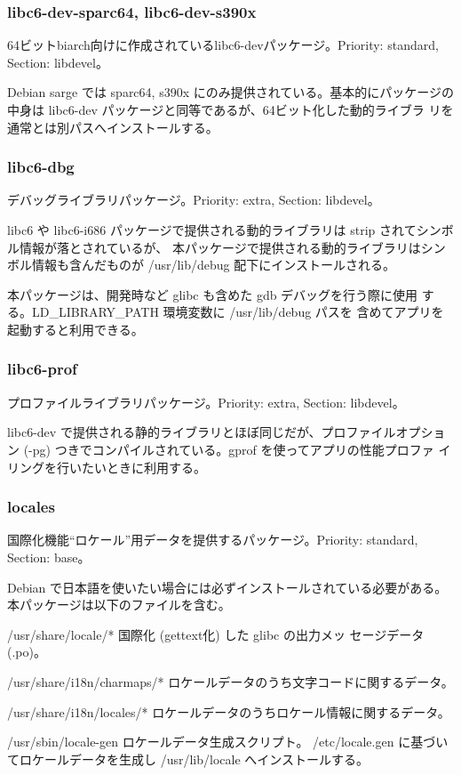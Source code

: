 \documentclass[mingoth]{jsarticle}
\newenvironment{gdescription}%
{%
   \begin{list}{}%
   {%
      \setlength{\itemindent}{0mm}
      \setlength{\leftmargin}{45mm}%
      \setlength{\rightmargin}{0zw}%
      \setlength{\labelsep}{4mm}%
      \setlength{\labelwidth}{4cm}%
      \setlength{\itemsep}{0em}%
      \setlength{\parsep}{0cm}%
      \setlength{\listparindent}{0cm}%
      \let\makelabel\gdescriptionlabel
   }
}{%
   \end{list}%
}
\newcommand*\gdescriptionlabel[1]{\hspace\labelsep\normalfont\bfseries #1}
\begin{document}
  \subsubsection{libc6-dev-sparc64, libc6-dev-s390x}

    64ビットbiarch向けに作成されているlibc6-devパッケージ。Priority: standard, Section:
    libdevel。

    Debian sarge では
    sparc64, s390x にのみ提供されている。基本的にパッケージの中身は 
    libc6-dev パッケージと同等であるが、64ビット化した動的ライブラ
    リを通常とは別パスへインストールする。
 
  \subsubsection{libc6-dbg}

    デバッグライブラリパッケージ。Priority: extra, Section: libdevel。

    libc6 や libc6-i686 パッケージで提供される動的ライブラリは
    strip されてシンボル情報が落とされているが、
    本パッケージで提供される動的ライブラリはシンボル情報も含んだものが
    /usr/lib/debug 配下にインストールされる。
    
    本パッケージは、開発時など glibc も含めた gdb デバッグを行う際に使用
    する。LD\_LIBRARY\_PATH 環境変数に /usr/lib/debug パスを
    含めてアプリを起動すると利用できる。

  \subsubsection{libc6-prof}

    プロファイルライブラリパッケージ。Priority: extra, Section: libdevel。

    libc6-dev で提供される静的ライブラリとほぼ同じだが、プロファイルオプション
    (-pg) つきでコンパイルされている。gprof を使ってアプリの性能プロファ
    イリングを行いたいときに利用する。

  \subsubsection{locales}

    国際化機能``ロケール''用データを提供するパッケージ。Priority: standard, Section: base。    

    Debian で日本語を使いたい場合には必ずインストールされている必要がある。本パッケージは以下のファイルを含む。

    \begin{gdescription}
      \item[/usr/share/locale/*] 国際化 (gettext化) した glibc の出力メッ
		 セージデータ(.po)。
      \item[/usr/share/i18n/charmaps/*] ロケールデータのうち文字コードに関するデータ。
      \item[/usr/share/i18n/locales/*] ロケールデータのうちロケール情報に関するデータ。
      \item[/usr/sbin/locale-gen] ロケールデータ生成スクリプト。
		 /etc/locale.gen に基づいてロケールデータを生成し
		 /usr/lib/locale へインストールする。
    \end{gdescription}
\end{document}
